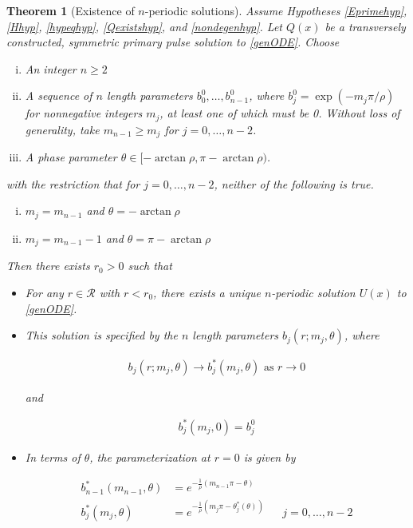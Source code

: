 \documentclass[12pt]{article}
\newtheorem{theorem}{Theorem}
\begin{document}
\begin{theorem}[Existence of $n$-periodic solutions]\label{perexist}
Assume Hypotheses \ref{Eprimehyp}, \ref{Hhyp}, \ref{hypeqhyp}, \ref{Qexistshyp}, and \ref{nondegenhyp}. Let $Q(x)$ be a transversely constructed, symmetric primary pulse solution to \eqref{genODE}. Choose

\begin{enumerate}[(i)]
\item An integer $n \geq 2$ 
\item A sequence of $n$ length parameters $b_0^0, \dots, b_{n-1}^0$, where $b_j^0 = \exp(-m_j \pi / \rho )$ for nonnegative integers $m_j$, at least one of which must be 0. Without loss of generality, take $m_{n-1} \geq m_j$ for $j = 0, \dots, n-2$. 
\item A phase parameter $\theta \in [-\arctan \rho, \pi - \arctan \rho)$.
\end{enumerate}

with the restriction that for $j = 0, \dots, n-2$, neither of the following is true.

\begin{enumerate}[(i)]
\item $m_j = m_{n-1}$ and $\theta = -\arctan \rho$
\item $m_j = m_{n-1} - 1$ and $\theta = \pi-\arctan \rho$
\end{enumerate}

Then there exists $r_0 > 0$ such that

\begin{itemize}
\item For any $r \in \mathcal{R}$ with $r < r_0$, there exists a unique $n$-periodic solution $U(x)$ to \eqref{genODE}.

\item This solution is specified by the $n$ length parameters $b_j(r; m_j, \theta)$, where

\begin{align}
b_j(r; m_j, \theta) \rightarrow b^*_j(m_j, \theta) \text{ as } r \rightarrow 0
\end{align}

and

\begin{align}
b^*_j(m_j, 0) = b_j^0
\end{align}

\item In terms of $\theta$, the parameterization at $r = 0$ is given by

\begin{align}
b_{n-1}^*(m_{n-1}, \theta) &= e^{ -\frac{1}{\rho}(m_{n-1} \pi - \theta) } \\
b_j^*(m_j, \theta) &= e^{-\frac{1}{\rho} (m_j \pi - \theta^*_j(\theta)) } && j = 0, \dots, n-2
\end{align}


\end{itemize}
\end{theorem}
\end{document}
